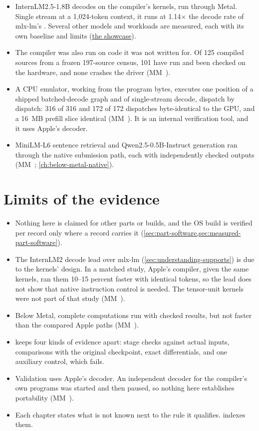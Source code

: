 \begin{itemize}
\item InternLM2.5-1.8B decodes on the compiler's kernels, run through Metal. Single
  stream at a 1,024-token context, it runs at 1.14× the decode rate of mlx-lm's . Several other models and workloads are
  measured, each with its own baseline and limits (\href{https://github.com/sbryngelson/AGXForge/blob/main/docs/showcase.md}{the showcase}).
\item The compiler was also run on code it was not written for. Of 125 compiled sources from a frozen 197-source
  census, 101 have run and been checked on the hardware, and none crashes the driver (MM~).
\item A CPU emulator, working from the program bytes, executes one position of a shipped batched-decode
  graph and of single-stream decode, dispatch by dispatch: 316 of 316 and 172 of 172 dispatches byte-identical to the
  GPU, and a 16~MB prefill slice identical (MM~). It is an internal verification tool, and it uses Apple's
  decoder.
\item MiniLM-L6 sentence retrieval and Qwen2.5-0.5B-Instruct generation ran through
  the native submission path, each with independently checked outputs (MM~; \cref{ch:below-metal-native}).
\end{itemize}

\section{Limits of the evidence}\label{sec:where-evidence-stops}

\begin{itemize}
\item Nothing here is claimed for other parts or builds, and the OS build is
  verified per record only where a record carries it (\cref{sec:part-software,sec:measured-part-software}).
\item The InternLM2 decode lead over mlx-lm (\cref{sec:understanding-supports})
  is due to the kernels' design. In a matched study, Apple's compiler, given the same kernels, ran them 10–15 percent
  faster with identical tokens, so the lead does not show that native instruction control is needed. The tensor-unit
  kernels were not part of that study (MM~).
\item Below Metal, complete computations run with checked results, but not faster
  than the compared Apple paths (MM~).
\item {} keeps four kinds of evidence apart: stage checks
  against actual inputs, comparisons with the original checkpoint, exact differentials, and one auxiliary control,
  which fails.
\item Validation uses Apple's decoder. An independent decoder for the compiler's
  own programs was started and then paused, so nothing here establishes portability (MM~).
\item Each chapter states what is not known next to the rule it qualifies.
   indexes them.
\end{itemize}

